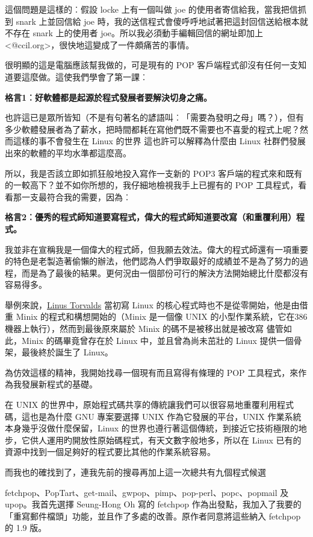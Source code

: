 \documentclass[10pt, b5paper]{book}
\makeatletter
\newcommand*{\shifttext}[2]{%
  \settowidth{\@tempdima}{#2}%
  \makebox[\@tempdima]{\hspace*{#1}#2}%
}
\makeatother
\begin{document}
這個問題是這樣的︰假設 locke 上有一個叫做 joe
的使用者寄信給我，當我把信抓到 snark 上並回信給 joe
時，我的送信程式會傻呼呼地試著把這封回信送給根本就不存在 snark 上的使用者
joe。所以我必須動手編輯回信的網址即加上
\textless{}@ccil.org\textgreater{}，很快地這變成了一件頗痛苦的事情。

很明顯的這是電腦應該幫我做的，可是現有的 POP
客戶端程式卻沒有任何一支知道要這麼做。這使我們學會了第一課︰

\textbf{格言1︰好軟體都是起源於程式發展者要解決切身之痛。}

也許這已是眾所皆知（不是有句著名的諺語叫︰「需要為發明之母」嗎？），但有多少軟體發展者為了薪水，把時間都耗在寫他們既不需要也不喜愛的程式上呢？然而這樣的事不會發生在
Linux 的世界 \shifttext{1pt}{---}\shifttext{-1pt}{---} 這也許可以解釋為什麼由 Linux
社群們發展出來的軟體的平均水準都這麼高。

所以，我是否該立即如抓狂般地投入寫作一支新的 POP3
客戶端的程式來和既有的一較高下？並不如你所想的，我仔細地檢視我手上已握有的
POP 工具程式，看看那一支最符合我的需要，因為︰

\textbf{格言2︰優秀的程式師知道要寫程式，偉大的程式師知道要改寫（和重覆利用）程式。}

我並非在宣稱我是一個偉大的程式師，但我願去效法。偉大的程式師還有一項重要的特色是老製造著偷懶的辦法，他們認為人們爭取最好的成績並不是為了努力的過程，而是為了最後的結果。更何況由一個部份可行的解決方法開始總比什麼都沒有容易得多。

舉例來說，\href{http://www.tuxedo.org/~esr/faqs/linus}{Linus Torvalds}
當初寫 Linux 的核心程式時也不是從零開始，他是由借重 Minix
的程式和構想開始的（Minix 是一個像 UNIX
的小型作業系統，它在386機器上執行），然而到最後原來屬於 Minix
的碼不是被移出就是被改寫 \shifttext{1pt}{---}\shifttext{-1pt}{---} 儘管如此，Minix 的碼畢竟曾存在於 Linux
中，並且曾為尚未茁壯的 Linux 提供一個骨架，最後終於誕生了 Linux。

為仿效這樣的精神，我開始找尋一個現有而且寫得有條理的 POP
工具程式，來作為我發展新程式的基礎。

在 UNIX
的世界中，原始程式碼共享的傳統讓我們可以很容易地重覆利用程式碼，這也是為什麼
GNU 專案要選擇 UNIX 作為它發展的平台，UNIX
作業系統本身幾乎沒做什麼保留，Linux
的世界也遵行著這個傳統，到接近它技術極限的地步，它供人運用旳開放性原始碼程式，有天文數字般地多，所以在
Linux 已有的資源中找到一個足夠好的程式要比其他的作業系統容易。

而我也的確找到了，連我先前的搜尋再加上這一次總共有九個程式候選 \shifttext{1pt}{---}\shifttext{-1pt}{---}
fetchpop、PopTart、get-mail、gwpop、pimp、pop-perl、popc、popmail 及
upop。我首先選擇 Seung-Hong Oh 寫的 fetchpop
作為出發點，我加入了我要的「重寫郵件檔頭」功能，並且作了多處的改善。原作者同意將這些納入
fetchpop 的 1.9 版。
\end{document}
